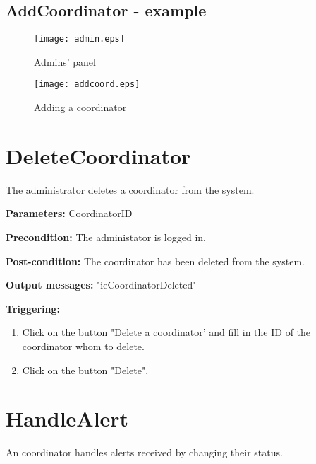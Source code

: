 \subsection{AddCoordinator - example}

\begin{figure}
    \texttt{[image: admin.eps]}
	\caption{Admins' panel}
\end{figure}

\begin{figure}
    \texttt{[image: addcoord.eps]}
	\caption{Adding a coordinator}
\end{figure}



\section{DeleteCoordinator}
\label{operation:DeleteCoordinator}

The administrator deletes a coordinator from the system.

\begin{description}
	\item \textbf{Parameters:} CoordinatorID
	\item \textbf{Precondition:} The administator is logged in.
	\item \textbf{Post-condition:} The coordinator has been deleted from the
	system.
	\item \textbf{Output messages:} "ieCoordinatorDeleted"
	
	\item \textbf{Triggering:}
	
	\begin{enumerate}
		\item Click on the button "Delete a coordinator' and fill in the ID of the
		coordinator whom to delete.
		\item Click on the button "Delete". %
	\end{enumerate}
\end{description}


\section{HandleAlert}
\label{operation:HandleAlert}

An coordinator handles alerts received by changing their status.


